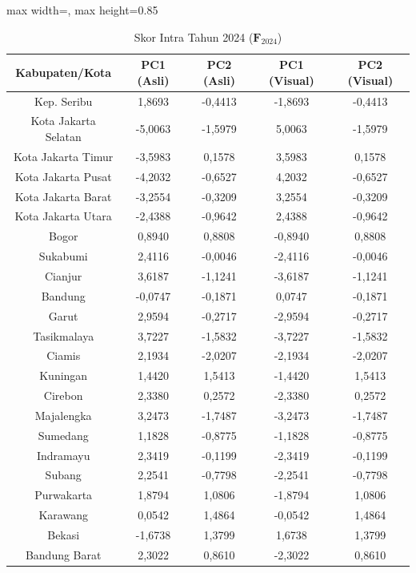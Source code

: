 \begin{table}[H]
\centering
\caption{Skor Intra Tahun 2024 ($\mathbf{F}_{2024}$)} \label{tab:app2skor_intra_2024}
\begin{adjustbox}{max width=\textwidth, max height=0.85\textheight}
\begin{tabular}{|c|c|c|c|c|}
\hline
\textbf{Kabupaten/Kota} & \textbf{PC1 (Asli)} & \textbf{PC2 (Asli)} & \textbf{PC1 (Visual)} & \textbf{PC2 (Visual)} \\
\hline
Kep. Seribu & 1,8693 & -0,4413 & -1,8693 & -0,4413 \\
Kota Jakarta Selatan & -5,0063 & -1,5979 & 5,0063 & -1,5979 \\
Kota Jakarta Timur & -3,5983 & 0,1578 & 3,5983 & 0,1578 \\
Kota Jakarta Pusat & -4,2032 & -0,6527 & 4,2032 & -0,6527 \\
Kota Jakarta Barat & -3,2554 & -0,3209 & 3,2554 & -0,3209 \\
Kota Jakarta Utara & -2,4388 & -0,9642 & 2,4388 & -0,9642 \\
Bogor & 0,8940 & 0,8808 & -0,8940 & 0,8808 \\
Sukabumi & 2,4116 & -0,0046 & -2,4116 & -0,0046 \\
Cianjur & 3,6187 & -1,1241 & -3,6187 & -1,1241 \\
Bandung & -0,0747 & -0,1871 & 0,0747 & -0,1871 \\
Garut & 2,9594 & -0,2717 & -2,9594 & -0,2717 \\
Tasikmalaya & 3,7227 & -1,5832 & -3,7227 & -1,5832 \\
Ciamis & 2,1934 & -2,0207 & -2,1934 & -2,0207 \\
Kuningan & 1,4420 & 1,5413 & -1,4420 & 1,5413 \\
Cirebon & 2,3380 & 0,2572 & -2,3380 & 0,2572 \\
Majalengka & 3,2473 & -1,7487 & -3,2473 & -1,7487 \\
Sumedang & 1,1828 & -0,8775 & -1,1828 & -0,8775 \\
Indramayu & 2,3419 & -0,1199 & -2,3419 & -0,1199 \\
Subang & 2,2541 & -0,7798 & -2,2541 & -0,7798 \\
Purwakarta & 1,8794 & 1,0806 & -1,8794 & 1,0806 \\
Karawang & 0,0542 & 1,4864 & -0,0542 & 1,4864 \\
Bekasi & -1,6738 & 1,3799 & 1,6738 & 1,3799 \\
Bandung Barat & 2,3022 & 0,8610 & -2,3022 & 0,8610 \\

\end{tabular}
\end{adjustbox}
\end{table}
